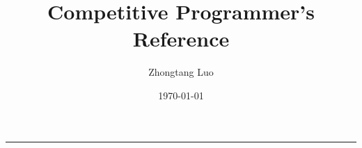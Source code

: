 \documentclass[10pt, oneside]{book}
\title{Competitive Programmer's Reference}
\author{Zhongtang Luo}
\date{\today}
\begin{document}
    \makeatletter
    \begin{titlepage}
        {
            \centering
            \vspace*{6cm}
            {\huge\bfseries \@title \par}
            \vspace{1.5cm}
            {\Large \@author \par}
            \vspace{1.5cm}
            {\Large \@date \par}
        }
        \vspace{1.5cm}
        \noindent\rule{\textwidth}{1pt} \par
        \vspace{1.5cm}
        
    \end{titlepage}
    \makeatother

    \begingroup
    \let\clearpage\relax
    \let\cleardoublepage\relax
    
    \begin{multicols}{2}
        \tableofcontents

        
        
        
    \end{multicols}
    
    \endgroup
\end{document}
